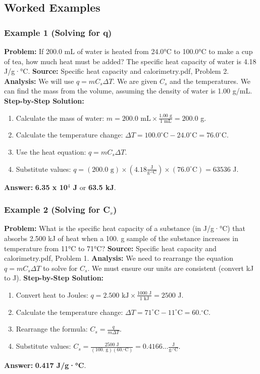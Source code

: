 \documentclass{article}
\begin{document}
\subsection{Worked Examples}
\subsubsection{Example 1 (Solving for q)}
\textbf{Problem:} If 200.0 mL of water is heated from 24.0°C to 100.0°C to make a cup of tea, how much heat must be added? The specific heat capacity of water is 4.18 J/g·°C.
\textbf{Source:} Specific heat capacity and calorimetry.pdf, Problem 2.
\textbf{Analysis:} We will use $q = mC_s\Delta T$. We are given $C_s$ and the temperatures. We can find the mass from the volume, assuming the density of water is 1.00 g/mL.
\textbf{Step-by-Step Solution:}
\begin{enumerate}
    \item Calculate the mass of water: $m = 200.0 \text{ mL} \times \frac{1.00 \text{ g}}{1 \text{ mL}} = 200.0$ g.
    \item Calculate the temperature change: $\Delta T = 100.0^\circ\text{C} - 24.0^\circ\text{C} = 76.0^\circ\text{C}$.
    \item Use the heat equation: $q = mC_s\Delta T$.
    \item Substitute values: $q = (200.0 \text{ g}) \times (4.18 \frac{\text{J}}{\text{g}\cdot^\circ\text{C}}) \times (76.0^\circ\text{C}) = 63536$ J.
\end{enumerate}
\textbf{Answer:} \textbf{6.35 x 10$^4$ J} or \textbf{63.5 kJ}.

\subsubsection{Example 2 (Solving for C$_s$)}
\textbf{Problem:} What is the specific heat capacity of a substance (in J/g·°C) that absorbs 2.500 kJ of heat when a 100. g sample of the substance increases in temperature from 11°C to 71°C?
\textbf{Source:} Specific heat capacity and calorimetry.pdf, Problem 1.
\textbf{Analysis:} We need to rearrange the equation $q=mC_s\Delta T$ to solve for $C_s$. We must ensure our units are consistent (convert kJ to J).
\textbf{Step-by-Step Solution:}
\begin{enumerate}
    \item Convert heat to Joules: $q = 2.500 \text{ kJ} \times \frac{1000 \text{ J}}{1 \text{ kJ}} = 2500$ J.
    \item Calculate the temperature change: $\Delta T = 71^\circ\text{C} - 11^\circ\text{C} = 60.^\circ\text{C}$.
    \item Rearrange the formula: $C_s = \frac{q}{m\Delta T}$.
    \item Substitute values: $C_s = \frac{2500 \text{ J}}{(100. \text{ g})(60.^\circ\text{C})} = 0.4166... \frac{\text{J}}{\text{g}\cdot^\circ\text{C}}$.
\end{enumerate}
\textbf{Answer:} \textbf{0.417 J/g·°C}.
\end{document}
